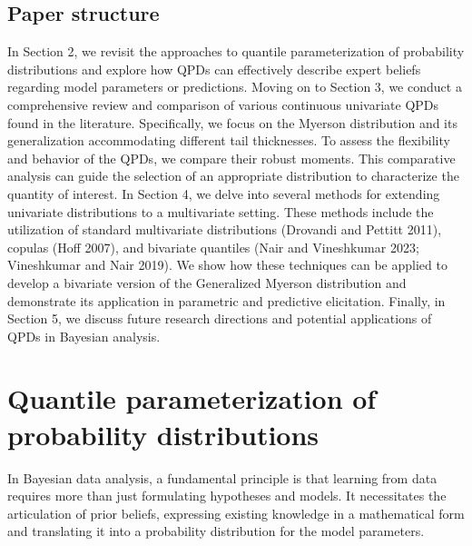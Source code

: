 \documentclass[
]{interact}
\begin{document}
\subsection*{Paper structure}\label{paper-structure}

In Section 2, we revisit the approaches to quantile parameterization of
probability distributions and explore how QPDs can effectively describe
expert beliefs regarding model parameters or predictions. Moving on to
Section 3, we conduct a comprehensive review and comparison of various
continuous univariate QPDs found in the literature. Specifically, we
focus on the Myerson distribution and its generalization accommodating
different tail thicknesses. To assess the flexibility and behavior of
the QPDs, we compare their robust moments. This comparative analysis can
guide the selection of an appropriate distribution to characterize the
quantity of interest. In Section 4, we delve into several methods for
extending univariate distributions to a multivariate setting. These
methods include the utilization of standard multivariate distributions
(Drovandi and Pettitt 2011), copulas (Hoff 2007), and bivariate
quantiles (Nair and Vineshkumar 2023; Vineshkumar and Nair 2019). We
show how these techniques can be applied to develop a bivariate version
of the Generalized Myerson distribution and demonstrate its application
in parametric and predictive elicitation. Finally, in Section 5, we
discuss future research directions and potential applications of QPDs in
Bayesian analysis.

\section{Quantile parameterization of probability
distributions}\label{quantile-parameterization-of-probability-distributions}

In Bayesian data analysis, a fundamental principle is that learning from
data requires more than just formulating hypotheses and models. It
necessitates the articulation of prior beliefs, expressing existing
knowledge in a mathematical form and translating it into a probability
distribution for the model parameters.
\end{document}
